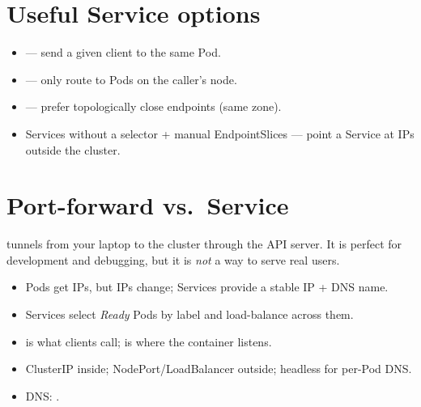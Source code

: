 \section{Useful Service options}

\begin{itemize}
  \item {} --- send a given client to the same Pod.
  \item {} --- only route to Pods on the caller's node.
  \item {} --- prefer topologically close endpoints (same zone).
  \item Services without a selector + manual EndpointSlices --- point a
        Service at IPs outside the cluster.
\end{itemize}

\section{Port-forward vs.\ Service}

 tunnels from your laptop to the
cluster through the API server. It is perfect for development and debugging,
but it is \emph{not} a way to serve real users.

\begin{recap}
\begin{itemize}
  \item Pods get IPs, but IPs change; Services provide a stable IP + DNS name.
  \item Services select \emph{Ready} Pods by label and load-balance across them.
  \item {} is what clients call;  is where the container listens.
  \item ClusterIP inside; NodePort/LoadBalancer outside; headless for per-Pod DNS.
  \item DNS: .
\end{itemize}
\end{recap}
